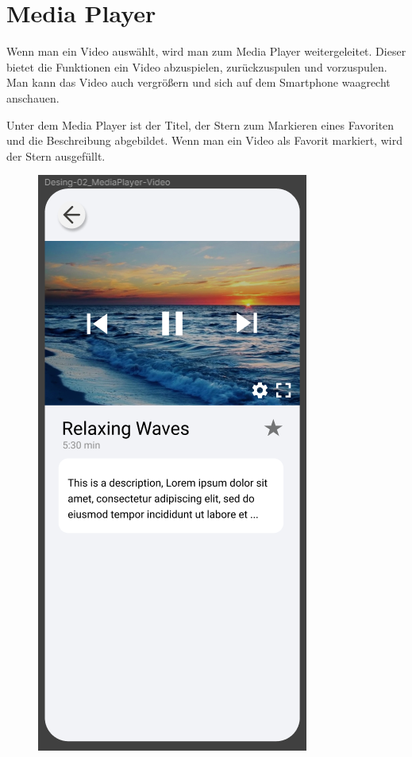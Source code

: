 \section{Media Player}

Wenn man ein Video auswählt, wird man zum Media Player weitergeleitet. Dieser bietet die
Funktionen ein Video abzuspielen, zurückzuspulen und vorzuspulen. Man kann das Video auch vergrößern und sich auf dem
Smartphone waagrecht anschauen.

Unter dem Media Player ist der Titel, der Stern zum Markieren eines Favoriten und die Beschreibung abgebildet.
Wenn man ein Video als Favorit markiert, wird der Stern ausgefüllt.

\begin{figure}[H]
    \begin{minipage}{0.5\textwidth}
        \centering
        \includegraphics[height=2\textwidth]{./pics/pMediaPlayer.png}

\end{minipage}
\end{figure}
